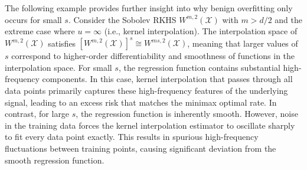 \documentclass{article}
\theoremstyle{plain}
\theoremstyle{definition}
\theoremstyle{remark}
\begin{document}

The following example provides further insight into why benign overfitting only occurs for small $s$.
Consider the Sobolev RKHS $W^{m,2}(\mathcal{X})$ with $m > d/2$ and the extreme case where $u=\infty$ (i.e., kernel interpolation). The interpolation space of $W^{m,2}(\mathcal{X})$ satisfies $[W^{m,2}(\mathcal{X})]^s \cong W^{m s, 2}(\mathcal{X})$, meaning that larger values of $s$ correspond to higher-order differentiability and smoothness of functions in the interpolation space.
For small $s$, the regression function contains substantial high-frequency components. In this case, kernel interpolation that passes through all data points primarily captures these high-frequency features of the underlying signal, leading to an excess risk that matches the minimax optimal rate. 
In contrast, for large $s$, the regression function is inherently smooth. However, noise in the training data forces the kernel interpolation estimator to oscillate sharply to fit every data point exactly. This results in spurious high-frequency fluctuations between training points, causing significant deviation from the smooth regression function.
\end{document}
